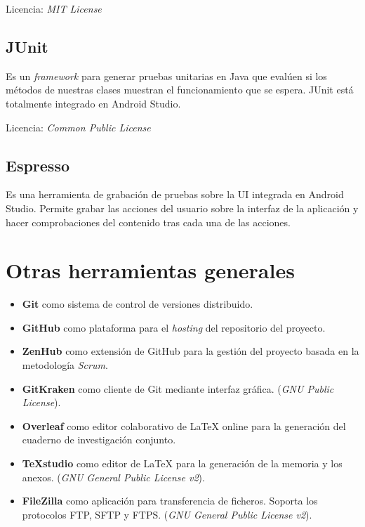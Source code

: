 Licencia: \textit{MIT License}

\subsection{JUnit}

Es un \textit{framework} para generar pruebas unitarias en Java que evalúen si los métodos de nuestras clases muestran el funcionamiento que se espera. JUnit está totalmente integrado en Android Studio. 

Licencia: \textit{Common Public License} 

\subsection{Espresso}

Es una herramienta de grabación de pruebas sobre la UI integrada en Android Studio. Permite grabar las acciones del usuario sobre la interfaz de la aplicación y hacer comprobaciones del contenido tras cada una de las acciones. 

\section{Otras herramientas generales}

\begin{itemize}
	\item \textbf{Git} como sistema de control de versiones distribuido. 
	\item \textbf{GitHub} como plataforma para el \textit{hosting} del repositorio del proyecto. 
	\item \textbf{ZenHub} como extensión de GitHub para la gestión del proyecto basada en la metodología \textit{Scrum}. 
	\item \textbf{GitKraken} como cliente de Git mediante interfaz gráfica. (\textit{GNU Public License}).
	\item \textbf{Overleaf} como editor colaborativo de \LaTeX{} online para la generación del cuaderno de investigación conjunto. 
	\item \textbf{\TeX studio} como editor de \LaTeX{} para la generación de la memoria y los anexos. (\textit{GNU General Public License v2}).
	\item \textbf{FileZilla} como aplicación para transferencia de ficheros. Soporta los protocolos FTP, SFTP y FTPS. (\textit{GNU General Public License v2}).
\end{itemize}




















